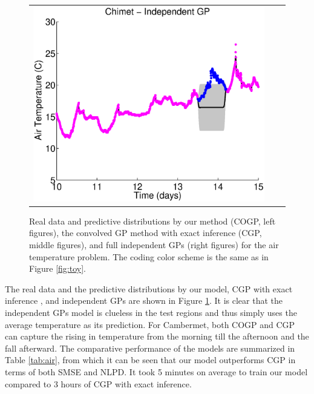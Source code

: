 \begin{figure}
\begin{tabular}{ccc}
\includegraphics[scale=0.3]{figures/weatherChimet.eps}
\end{tabular}
\caption{Real data and predictive distributions by our method (COGP, left figures), the convolved GP method with exact inference (CGP, middle figures), and full independent GPs (right figures) for the air temperature problem. The coding color scheme is the same as in Figure \ref{fig:toy}.}
\label{fig:weather}
\end{figure}

The real data and the predictive distributions by our model, CGP with exact inference \citep{alvarez-lawrence-nips-08}, and independent GPs are shown in Figure \ref{fig:weather}.
It is clear that the independent GPs model is clueless in the test regions and thus simply uses the average temperature as its prediction.
For Cambermet, both COGP and CGP can capture the rising in temperature from the morning till the afternoon and the fall afterward.
The comparative performance of the models are summarized in Table \ref{tab:air}, from which it can be seen that our model outperforms CGP in terms of both SMSE and NLPD.
It took 5 minutes on average to train our model compared to 3 hours of CGP with exact inference.

